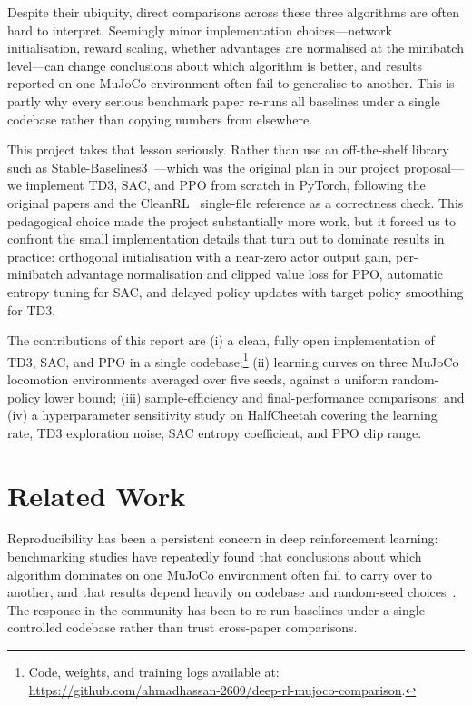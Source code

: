 \documentclass[letterpaper]{article}
\begin{document}
Despite their ubiquity, direct comparisons across these three algorithms
are often hard to interpret. Seemingly minor implementation
choices---network initialisation, reward scaling, whether advantages are
normalised at the minibatch level---can change conclusions about which
algorithm is better, and results reported on one MuJoCo environment often
fail to generalise to another. This is partly why every serious benchmark
paper re-runs all baselines under a single codebase rather than copying
numbers from elsewhere.

This project takes that lesson seriously. Rather than use an off-the-shelf
library such as Stable-Baselines3~\citep{raffin2021sb3}---which was the
original plan in our project proposal---we implement TD3, SAC, and PPO
from scratch in PyTorch, following the original papers and the
CleanRL~\citep{huang2022cleanrl} single-file reference as a correctness
check. This pedagogical choice made the project substantially more work,
but it forced us to confront the small implementation details that turn out
to dominate results in practice: orthogonal initialisation with a
near-zero actor output gain, per-minibatch advantage normalisation and
clipped value loss for PPO, automatic entropy tuning for SAC, and delayed
policy updates with target policy smoothing for TD3.

The contributions of this report are (i) a clean, fully open implementation
of TD3, SAC, and PPO in a single codebase;\footnote{Code, weights, and
training logs available at:\\[0.2ex]
\mbox{\scriptsize\url{https://github.com/ahmadhassan-2609/deep-rl-mujoco-comparison}}.} (ii)
learning curves on three MuJoCo locomotion environments averaged over five
seeds, against a uniform random-policy lower bound; (iii) sample-efficiency
and final-performance comparisons; and (iv) a hyperparameter sensitivity
study on HalfCheetah covering the learning rate, TD3 exploration noise,
SAC entropy coefficient, and PPO clip range.

\section{Related Work}

Reproducibility has been a persistent concern in deep reinforcement
learning: benchmarking studies have repeatedly found that conclusions
about which algorithm dominates on one MuJoCo environment often fail to
carry over to another, and that results depend heavily on codebase and
random-seed choices~\citep{ahmad2023evaluation}. The response in the
community has been to re-run baselines under a single controlled
codebase rather than trust cross-paper comparisons.
\end{document}
